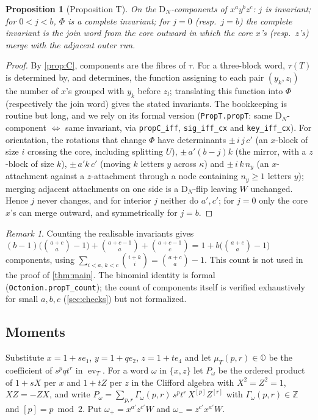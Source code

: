 \documentclass[11pt,a4paper]{article}
\newtheorem{proposition}[thm]{Proposition}
\theoremstyle{definition}
\theoremstyle{remark}
\newtheorem{remark}[thm]{Remark}
\newcommand{\OO}{\mathbb{O}}
\newcommand{\ZZ}{\mathbb{Z}}
\newcommand{\DN}{\mathrm{D}_N}
\newcommand{\lean}[1]{\texttt{#1}}
\DeclareMathOperator{\ev}{ev}
\begin{document}
\begin{proposition}[Proposition T]\label{prop:T}
On the $\DN$-components of $x^ay^bz^c$: $j$ is invariant; for $0<j<b$, $\Phi$ is a complete invariant;
for $j=0$ (resp.\ $j=b$) the complete invariant is the join word from the core outward in which the core
$x$'s (resp.\ $z$'s) merge with the adjacent outer run.
\end{proposition}
\begin{proof}
By \cref{prop:C}, components are the fibres of $\tau$. For a three-block word, $\tau(T)$ is determined
by, and determines, the function assigning to each pair $(y_k,z_l)$ the number of $x$'s grouped with
$y_k$ before $z_l$; translating this function into $\Phi$ (respectively the join word) gives the stated
invariants. The bookkeeping is routine but long, and we rely on its formal version
(\lean{PropT.propT}: same $\DN$-component $\iff$ same invariant, via \lean{propC\_iff},
\lean{sig\_iff\_cx} and \lean{key\_iff\_cx}). For orientation, the rotations that change $\Phi$ have
determinants $\pm\,i\,j\,c'$ (an $x$-block of size $i$ crossing the core, including splitting $U$),
$\pm\,a'(b-j)k$ (the mirror, with a $z$-block of size $k$), $\pm\,a'k\,c'$ (moving $k$ letters $y$ across
$\kappa$) and $\pm\,i\,k\,n_y$ (an $x$-attachment against a $z$-attachment through a node containing
$n_y\ge1$ letters $y$); merging adjacent attachments on one side is a $\DN$-flip leaving $W$ unchanged.
Hence $j$ never changes, and for interior $j$ neither do $a',c'$; for $j=0$ only the core $x$'s can merge
outward, and symmetrically for $j=b$.
\end{proof}

\begin{remark}
Counting the realisable invariants gives
$(b-1)\bigl(\binom{a+c}{a}-1\bigr)+\binom{a+c-1}{a}+\binom{a+c-1}{c}=1+b\bigl(\binom{a+c}{a}-1\bigr)$
components, using $\sum_{i<a,\,k<c}\binom{i+k}{i}=\binom{a+c}{a}-1$. This count is not used in the proof
of \cref{thm:main}. The binomial identity is formal (\lean{Octonion.propT\_count}); the count of
components itself is verified exhaustively for small $a,b,c$ (\cref{sec:checks}) but not formalized.
\end{remark}

\subsection{Moments}

Substitute $x=1+se_1$, $y=1+qe_2$, $z=1+te_4$ and let $\mu_T(p,r)\in\OO$ be the coefficient of
$s^pqt^r$ in $\ev_T$. For a word $\omega$ in $\{x,z\}$ let $P_\omega$ be the ordered product of $1+sX$
per $x$ and $1+tZ$ per $z$ in the Clifford algebra with $X^2=Z^2=1$, $XZ=-ZX$, and write
$P_\omega=\sum_{p,r}\Gamma_\omega(p,r)\,s^pt^r\,X^{[p]}Z^{[r]}$ with $\Gamma_\omega(p,r)\in\ZZ$ and
$[p]=p\bmod2$. Put $\omega_+=x^{a'}z^{c'}W$ and $\omega_-=z^{c'}x^{a'}W$.
\end{document}
